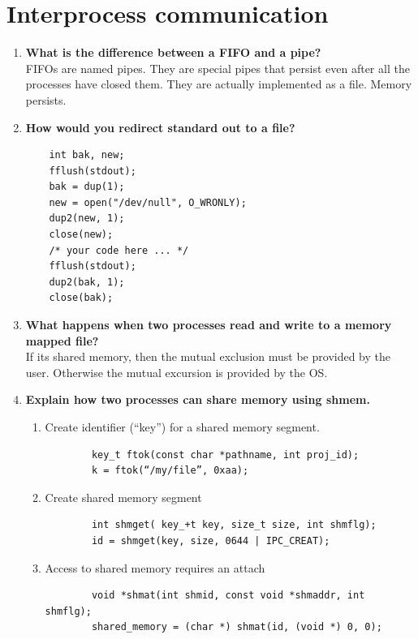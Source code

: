 \documentclass[a4paper]{article}
\begin{document}
\section{Interprocess communication} %
\label{sec:Interprocess communicatio}
\begin{enumerate}
  \item {\bf What is the difference between a FIFO and a pipe?}\\
    FIFOs are named pipes. They are special pipes that persist even after all the processes have closed them. They are actually implemented as a file. Memory persists.

  \item {\bf How would you redirect standard out to a file? }\\
    \begin{lstlisting}
    int bak, new;
    fflush(stdout);
    bak = dup(1);
    new = open("/dev/null", O_WRONLY);
    dup2(new, 1);
    close(new);
    /* your code here ... */
    fflush(stdout);
    dup2(bak, 1);
    close(bak);
    \end{lstlisting}

  \item {\bf What happens when two processes read and write to a memory mapped file?} \\
    If its shared memory, then the mutual exclusion must be provided by the user. Otherwise the mutual excursion is provided by the OS.

  \item {\bf Explain how two processes can share memory using shmem. } \\
    \begin{enumerate}
      \item Create identifier (``key'') for a shared memory segment.
        \begin{lstlisting}
        key_t ftok(const char *pathname, int proj_id);
        k = ftok(“/my/file”, 0xaa);    
        \end{lstlisting}
      \item Create shared memory segment
        \begin{lstlisting}
        int shmget( key_+t key, size_t size, int shmflg);
        id = shmget(key, size, 0644 | IPC_CREAT);
        \end{lstlisting}
      \item Access to shared memory requires an attach
        \begin{lstlisting}
        void *shmat(int shmid, const void *shmaddr, int shmflg);
        shared_memory = (char *) shmat(id, (void *) 0, 0); 
        \end{lstlisting}
    \end{enumerate}


\end{enumerate}
\end{document}
